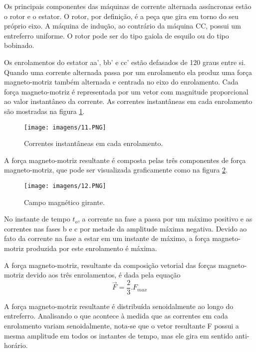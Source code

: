 Os principais componentes das máquinas de corrente alternada assíncronas estão o rotor e o estator. O rotor, por definição, é a peça que gira em torno do seu próprio eixo. A máquina de indução, ao contrário da máquina CC, possui um entreferro uniforme. O rotor pode ser do tipo gaiola de esquilo ou do tipo bobinado.
    
Os enrolamentos do estator aa’, bb’ e cc’ estão defasados de 120 graus entre si. Quando uma corrente alternada passa por um enrolamento ela produz uma força magneto-motriz também alternada e centrada no eixo do enrolamento. Cada força magneto-motriz é representada por um vetor com magnitude proporcional ao valor instantâneo da corrente. As correntes instantâneas em cada enrolamento são mostradas na figura \ref{fig:11}.

\begin{figure}[hbt]
    \center 
    \texttt{[image: imagens/11.PNG]}
    \caption{Correntes instantâneas em cada enrolamento.}\label{fig:11}
\end{figure}

A força magneto-motriz resultante é composta pelas três componentes de força
magneto-motriz, que pode ser visualizada graficamente como na figura \ref{fig:12}.

\begin{figure}[ht]
    \center 
    \texttt{[image: imagens/12.PNG]}
    \caption{Campo magnético girante.}\label{fig:12}
\end{figure}

No instante de tempo $t_o$, a corrente na fase a passa por um máximo positivo e as correntes nas fases b e c por metade da amplitude máxima negativa. Devido ao fato da corrente na fase a estar em um instante de máximo, a força magneto-motriz produzida por este enrolamento é máxima.

A força magneto-motriz, resultante da composição vetorial das forças magneto-motriz devido aos três enrolamentos, é dada pela equação
$$\vec{F} = \frac{2}{3}.F_{max}$$

A força magneto-motriz resultante é distribuída senoidalmente ao longo do entreferro. Analisando o que acontece à medida que as correntes em cada enrolamento variam senoidalmente, nota-se que o vetor resultante F possui a mesma amplitude em todos os
instantes de tempo, mas ele gira em sentido anti-horário.

